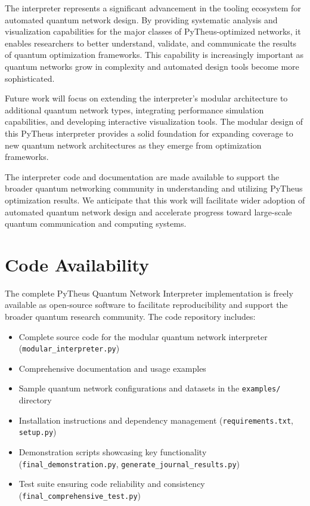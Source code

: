 \documentclass[11pt,a4paper]{article}
\begin{document}
The interpreter represents a significant advancement in the tooling ecosystem for automated quantum network design. By providing systematic analysis and visualization capabilities for the major classes of PyTheus-optimized networks, it enables researchers to better understand, validate, and communicate the results of quantum optimization frameworks. This capability is increasingly important as quantum networks grow in complexity and automated design tools become more sophisticated.

Future work will focus on extending the interpreter's modular architecture to additional quantum network types, integrating performance simulation capabilities, and developing interactive visualization tools. The modular design of this PyTheus interpreter provides a solid foundation for expanding coverage to new quantum network architectures as they emerge from optimization frameworks.

The interpreter code and documentation are made available to support the broader quantum networking community in understanding and utilizing PyTheus optimization results. We anticipate that this work will facilitate wider adoption of automated quantum network design and accelerate progress toward large-scale quantum communication and computing systems.

\section{Code Availability}

The complete PyTheus Quantum Network Interpreter implementation is freely available as open-source software to facilitate reproducibility and support the broader quantum research community. The code repository includes:

\begin{itemize}
\item Complete source code for the modular quantum network interpreter (\texttt{modular\_interpreter.py})
\item Comprehensive documentation and usage examples
\item Sample quantum network configurations and datasets in the \texttt{examples/} directory
\item Installation instructions and dependency management (\texttt{requirements.txt}, \texttt{setup.py})
\item Demonstration scripts showcasing key functionality (\texttt{final\_demonstration.py}, \texttt{generate\_journal\_results.py})
\item Test suite ensuring code reliability and consistency (\texttt{final\_comprehensive\_test.py})
\end{itemize}
\end{document}
